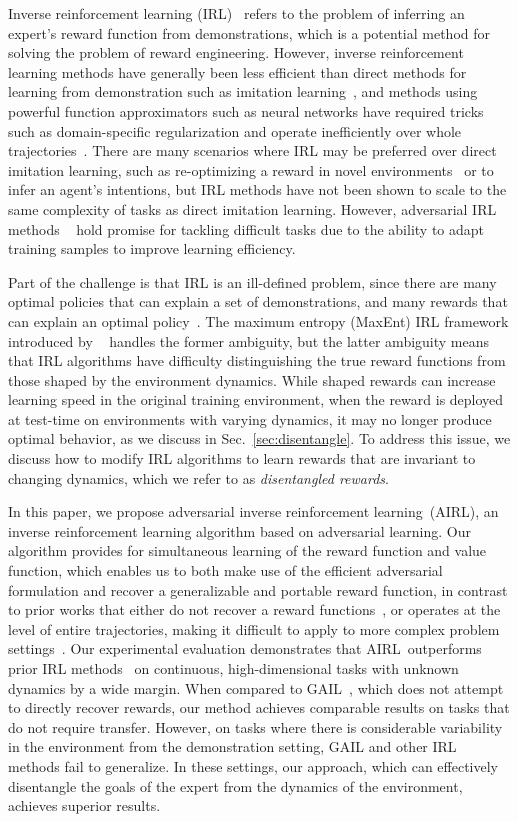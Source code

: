 \documentclass{article} \usepackage{iclr2018_conference,times}
\newcommand{\algname}{adversarial inverse reinforcement learning}
\newcommand{\algnameabbrev}{AIRL}
\begin{document}
Inverse reinforcement learning (IRL)~\citep{Russell98,Ng2000} refers to the problem of inferring an expert's reward function from demonstrations, which is a potential method for solving the problem of reward engineering. However, inverse reinforcement learning methods have generally been less efficient than direct methods for learning from demonstration such as imitation learning~\citep{Ho16b}, and methods using powerful function approximators such as neural networks have required tricks such as domain-specific regularization and operate inefficiently over whole trajectories~\citep{Finn16a}. There are many scenarios where IRL may be preferred over direct imitation learning, such as re-optimizing a reward in novel environments~\citep{Finn17} or to infer an agent's intentions, but IRL methods have not been shown to scale to the same complexity of tasks as direct imitation learning. However, adversarial IRL methods ~\citep{Finn16a,Finn16b} hold promise for tackling difficult tasks due to the ability to adapt training samples to improve learning efficiency.

Part of the challenge is that IRL is an ill-defined problem, since there are many optimal policies that can explain a set of demonstrations, and many rewards that can explain an optimal policy~\citep{Ng1999}. The maximum entropy (MaxEnt) IRL framework introduced by ~\citet{Ziebart08} handles the former ambiguity, but the latter ambiguity means that IRL algorithms have difficulty distinguishing the true reward functions from those shaped by the environment dynamics. While shaped rewards can increase learning speed in the original training environment, when the reward is deployed at test-time on environments with varying dynamics, it may no longer produce optimal behavior, as we discuss in Sec.~\ref{sec:disentangle}. To address this issue, we discuss how to modify IRL algorithms to learn rewards that are invariant to changing dynamics, which we refer to as \textit{disentangled rewards}.

In this paper, we propose \algname\ (\algnameabbrev), an inverse reinforcement learning algorithm based on adversarial learning. Our algorithm provides for simultaneous learning of the reward function and value function, which enables us to both make use of the efficient adversarial formulation and recover a generalizable and portable reward function, in contrast to prior works that either do not recover a reward functions~\citep{Ho16b}, or operates at the level of entire trajectories, making it difficult to apply to more complex problem settings~\citep{Finn16a,Finn16b}. 
Our experimental evaluation demonstrates that \algnameabbrev\ outperforms prior IRL methods~\citep{Finn16a} on continuous, high-dimensional tasks with unknown dynamics by a wide margin. When compared to GAIL~\citep{Ho16b}, which does not attempt to directly recover rewards, our method achieves comparable results on tasks that do not require transfer. However, on tasks where there is considerable variability in the environment from the demonstration setting, GAIL and other IRL methods fail to generalize. In these settings, our approach, which can effectively disentangle the goals of the expert from the dynamics of the environment, achieves superior results.
 
\end{document}
